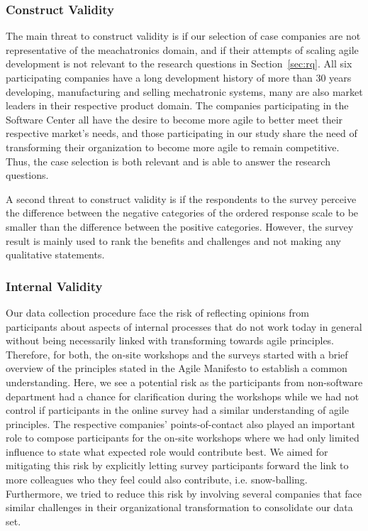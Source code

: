 \documentclass[10pt,a4paper]{IEEEtran} %
\begin{document}
\subsubsection{Construct Validity} 
The main threat to construct validity is if our selection of case companies are not representative of the meachatronics domain, and if their attempts of scaling agile development is not relevant to the research questions in Section~\ref{sec:rq}.
All six participating companies have a long development history of more than 30 years developing, manufacturing and selling mechatronic systems, many are also market leaders in their respective product domain. 
The companies participating in the Software Center all have the desire to become more agile to better meet their respective market's needs, and those participating in our study share the need of transforming their organization to become more agile to remain competitive. Thus, the case selection is both relevant and is able to answer the research questions.


A second threat to construct validity is if the  respondents to the survey perceive the difference between the negative categories of the ordered response scale to be smaller than the difference between the positive categories. However, the survey result is mainly used to rank the benefits and challenges and not  making any qualitative statements.



\subsubsection{Internal Validity}
Our data collection procedure 
face the risk of reflecting opinions from participants about aspects of internal processes that do not work today in general without being necessarily linked with transforming towards agile principles.
Therefore, for both, the on-site workshops and the surveys started with a brief overview of the principles stated in the Agile Manifesto to establish a common understanding. 
Here, we see a potential risk as the participants from non-software department had a chance for clarification during the workshops while we had not control if participants in the online survey had a similar understanding of agile principles.
The respective companies' points-of-contact also played an important role to compose participants for the on-site workshops where we had only limited influence to state what expected role would contribute best.
We aimed for mitigating this risk by explicitly letting survey participants forward the link to more colleagues who they feel could also contribute, i.e. snow-balling.
Furthermore, we tried to reduce this risk by involving several companies that face similar challenges in their organizational transformation to 
consolidate our data set. 
\end{document}
